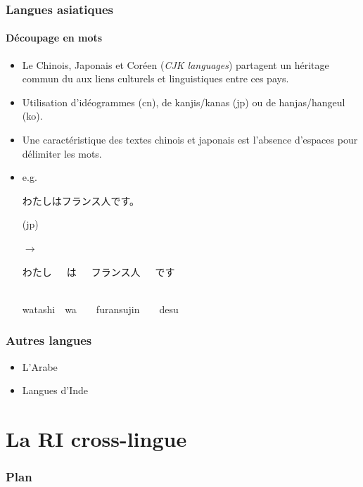 \documentclass[12pt,aspectratio=43,dvipsnames,table]{beamer}
\begin{document}
\begin{frame}
    \frametitle{Langues asiatiques}
    \framesubtitle{Découpage en mots}
    \begin{itemize} \itemsep10pt
        \item Le Chinois, Japonais et Coréen (\textit{CJK languages}) partagent 
              un héritage commun du aux liens culturels et linguistiques entre 
              ces pays.
        \item Utilisation d'idéogrammes (cn), de kanjis/kanas (jp) ou de 
              hanjas/hangeul (ko).
        \item Une caractéristique des textes chinois et japonais est l'absence 
              d'espaces pour délimiter les mots.
        \item e.g.~\begin{CJK}{UTF8}{min}わたしはフランス人です。\end{CJK} (jp)
        \item[$\to$] \begin{CJK}{UTF8}{min}わたし~~~は~~~フランス人~~~です\end{CJK} \\
                     watashi~~wa~~~~furansujin~~~~desu
    \end{itemize}
\end{frame}

\begin{frame}
    \frametitle{Autres langues}
    \begin{itemize} \itemsep10pt
        \item L'Arabe
        \item Langues d'Inde
    \end{itemize}
\end{frame}

\section{La RI cross-lingue}


\begin{frame}
\frametitle{Plan}
\tableofcontents[sectionstyle=show,subsectionstyle=hide,subsubsectionstyle=hide]
\end{frame}
\end{document}
